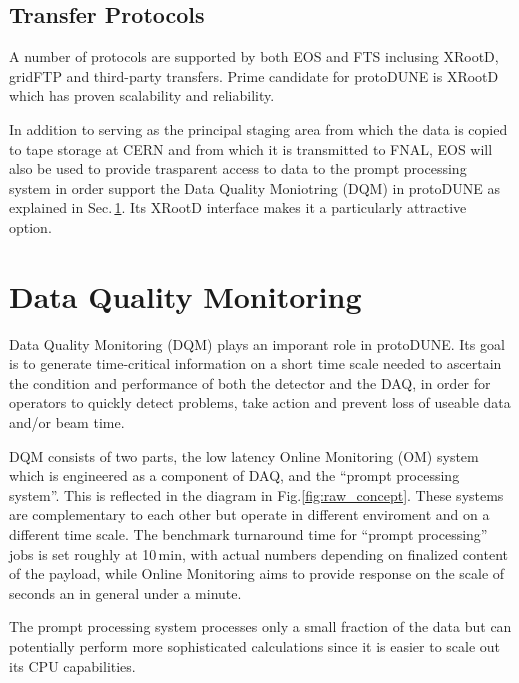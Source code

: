 \documentclass[a4paper]{jpconf}
\newcommand{\pd}{protoDUNE\xspace}
\begin{document}
\subsection{Transfer Protocols}
A number of protocols are supported by both EOS and FTS inclusing XRootD, gridFTP
and third-party transfers. Prime candidate for \pd is XRootD which has proven scalability
and reliability.

In addition to serving as the principal staging area from which the data is copied to
tape storage at CERN and from which it is transmitted to FNAL, 
EOS will also be used to provide trasparent access to data to the prompt processing system
in order support the Data Quality Moniotring (DQM) in \pd as explained in Sec.\,\ref{sec:dqm}.
Its XRootD interface makes it a particularly attractive option.

\section{Data Quality Monitoring}
\label{sec:dqm}
Data Quality Monitoring (DQM) plays an imporant role in \pd.
Its goal is to generate time-critical information on a short time
scale needed to ascertain the condition
and performance of both the detector and the DAQ,
in order for operators to quickly detect problems, take action and prevent loss
of useable data and/or beam time.

DQM consists of two parts,  the low latency Online Monitoring (OM)
system which is engineered as a component of DAQ, and
the ``prompt processing system''. This is reflected in the diagram
in Fig.\ref{fig:raw_concept}.
These systems are complementary to each other but operate
in different enviroment and on a different time scale.
The benchmark turnaround time for ``prompt processing'' jobs 
is set roughly at 10\,min, with actual numbers depending on
finalized content of the payload, while Online Monitoring aims
to provide response on the scale of seconds an in general under a minute.

The prompt processing system processes only a small fraction of the data
but can potentially perform more sophisticated calculations since it is
easier to scale out its CPU capabilities.
\end{document}
